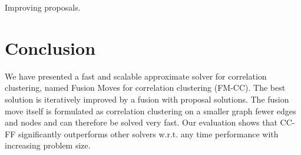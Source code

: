 \documentclass[10pt,twocolumn,letterpaper]{article}
\theoremstyle{definition}
\begin{document}
Improving proposals.




\section{Conclusion}\label{sec:conclusion}

We have presented a fast and scalable 
approximate solver for correlation 
clustering, named Fusion Moves for correlation clustering (FM-CC).
The best solution is iteratively improved 
by a fusion with proposal solutions.
The fusion move itself is formulated as correlation
clustering on a smaller graph fewer edges and nodes
and can therefore be solved very fast.
Our evaluation shows that CC-FF
significantly outperforms 
other solvers w.r.t. any time performance 
with increasing problem size.


    


\newpage

\FloatBarrier
{\small


}



% 
% 
% 
% 
% 
% 
% 
\end{document}
